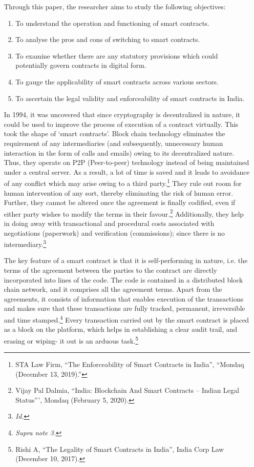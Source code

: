 \begin{multicols}{2}
\noi
Through this paper, the researcher aims to study the following objectives:
\begin{enumerate}[label=$\bullet$]
\item To understand the operation and functioning of smart contracts.
\item To analyse the pros and cons of switching to smart contracts.
\item To examine whether there are any statutory provisions which could potentially govern contracts in digital form.
\item To gauge the applicability of smart contracts across various sectors. 
\item To ascertain the legal validity and enforceability of smart contracts in India.
\end{enumerate}


\noi
In 1994, it was uncovered that since cryptography is decentralized in nature, it could be used
to improve the process of execution of a contract virtually. This took the shape of ‘smart
contracts’. Block chain technology eliminates the requirement of any intermediaries (and
subsequently, unnecessary human interaction in the form of calls and emails) owing to its
decentralized nature. Thus, they operate on P2P (Peer-to-peer) technology instead of being
maintained under a central server. As a result, a lot of time is saved and it leads to avoidance
of any conflict which may arise owing to a third party.\footnote{STA Law Firm, “The Enforceability of Smart Contracts in India”, “Mondaq (December 13, 2019).”}
 They rule out room for human
intervention of any sort, thereby eliminating the risk of human error. Further, they cannot be
altered once the agreement is finally codified, even if either party wishes to modify the terms
in their favour.\footnote{Vijay Pal Dalmia, “India: Blockchain And Smart Contracts – Indian Legal Status”’, Mondaq (February 5, 2020).}
 Additionally, they help in doing away with transactional and procedural costs
associated with negotiations (paperwork) and verification (commissions); since there is no
intermediary.\footnote{\textit{Id.}}

\noi
The key feature of a smart contract is that it is self-performing in nature, i.e. the terms of the
agreement between the parties to the contract are directly incorporated into lines of the code.
The code is contained in a distributed block chain network, and it comprises all the agreement
terms. Apart from the agreements, it consists of information that enables execution of the
transactions and makes sure that these transactions are fully tracked, permanent, irreversible
and time stamped.\footnote{\textit{Supra note 3.}} Every transaction carried out by the smart contract is placed as a block on the platform, which helps in establishing a clear audit trail, and erasing or wiping- it out is
an arduous task.\footnote{Rishi A, “The Legality of Smart Contracts in India”, India Corp Law (December 10, 2017).}


\end{multicols}
